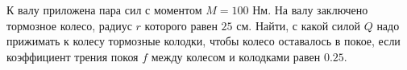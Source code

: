 К валу приложена пара сил с моментом $M=100$ Нм. На валу заключено
тормозное колесо, радиус $r$ которого равен $25$ см. Найти, с какой
силой $Q$ надо прижимать к колесу тормозные колодки, чтобы колесо
оставалось в покое, если коэффициент трения покоя $f$ между колесом и
колодками равен $0.25$.
